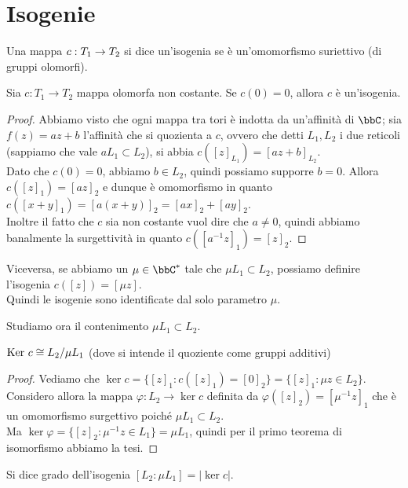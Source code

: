 	\section{Isogenie}
	\begin{definizione}
		Una mappa $c: T_1 \rightarrow T_2$ si dice un'isogenia se è un'omomorfismo suriettivo (di gruppi olomorfi).
	\end{definizione}
    \begin{proposizione}
        Sia $c:T_1\to T_2$ mappa olomorfa non costante. Se $c(0)=0$, allora $c$ è un'isogenia.
    \end{proposizione}
    \begin{proof}
        Abbiamo visto che ogni mappa tra tori è indotta da un'affinità di $\bbC$; sia $f(z)=az+b$ l'affinità che si quozienta a $c$, ovvero che detti $L_1,L_2$ i due reticoli (sappiamo che vale $aL_1\subset L_2$), si abbia $c([z]_{L_1})=[az+b]_{L_2}$.\\
        Dato che $c(0)=0$, abbiamo $b\in L_2$, quindi possiamo supporre $b=0$. Allora $c([z]_1)=[az]_2$ e dunque è omomorfismo in quanto $c([x+y]_1)=[a(x+y)]_2=[ax]_2+[ay]_2$.\\
        Inoltre il fatto che $c$ sia non costante vuol dire che $a\neq0$, quindi abbiamo banalmente la surgettività in quanto $c([a^{-1}z]_1)=[z]_2$.
    \end{proof}
    Viceversa, se abbiamo un $\mu\in\bbC^\ast$ tale che $\mu L_1\subset L_2$, possiamo definire l'isogenia $c([z])=[\mu z]$.\\
    Quindi le isogenie sono identificate dal solo parametro $\mu$.

    Studiamo ora il contenimento $\mu L_1\subset L_2$.

	\begin{proposizione}
		$\mbox{Ker } c \cong L_2 / \mu L_1$ (dove si intende il quoziente come gruppi additivi)
	\end{proposizione}
	\begin{proof}
		Vediamo che $\ker c=\{[z]_1 : c([z]_1)=[0]_2\} = \{[z]_1 : \mu z\in L_2\}$. Considero allora la mappa $\varphi:L_2\to\ker c$ definita da $\varphi([z]_2)=[\mu^{-1}z]_1$ che è un omomorfismo surgettivo poiché $\mu L_1\subset L_2$.\\
        Ma $\ker\varphi = \{[z]_2 : \mu^{-1} z\in L_1\}=\mu L_1$, quindi per il primo teorema di isomorfismo abbiamo la tesi.
	\end{proof}

	\begin{definizione}
		Si dice grado dell'isogenia $[L_2 : \mu L_1] = |\ker c|$.
    \end{definizione}


